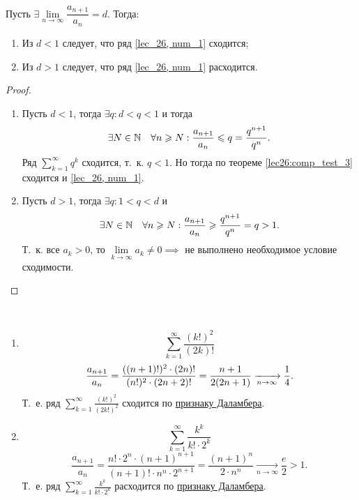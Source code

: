 \documentclass[../../main.tex]{subfiles}
\begin{document}
	\begin{thm}\label{lec27:dalamber}
		
		Пусть $\exists \lim\limits_{n \to \infty} \dfrac{a_{n+1}}{a_n} = d$. Тогда:
		\begin{enumerate}[label={\alph*)}]
		\item Из $d < 1$ следует, что ряд \eqref{lec_26, num_1} сходится;
		\item Из $d > 1$ следует, что ряд \eqref{lec_26, num_1} расходится.
		\end{enumerate}
	\end{thm}
		\begin{proof}
			
			~
			
			\begin{enumerate}[label={\alph*)}]
			\item Пусть $d < 1$, тогда $\exists q : d < q < 1$  и тогда \[\exists N \in 
			\mathbb{N} \quad
			\forall n \geqslant N:
			\frac{a_{n+1}}{a_n} \leqslant q = \frac{q^{n+1}}{q^n}.  \]
			Ряд $\sum\limits_{k=1}^{\infty} q^k$ сходится, т.~к. 
			$q<1$. Но тогда по теореме \ref{lec26:comp_test_3} сходится и 
			\eqref{lec_26, num_1}.
			\item Пусть $d > 1$, тогда $\exists q : 1 < q < d $ и \[\exists N \in \mathbb{N} 
			\quad \forall n 
			\geqslant N:
			\frac{a_{n+1}}{a_n} \geqslant \frac{q^{n+1}}{q^n} = q > 1.  \]
			Т.~к. все $a_k > 0$, то $\lim\limits_{k \to \infty} a_k \neq 0 \implies$ не 
			выполнено необходимое условие сходимости.
			\qedhere
			\end{enumerate}
		\end{proof}
	\begin{examples}

	~

	\begin{enumerate}
	 \item
		\[ \sum_{k = 1}^{\infty} \frac{(k!)^2}{(2k)!}    \]
		\[ \frac{a_{n+1}}{a_n} = \frac{((n+1)!)^2 \cdot (2n)!}{(n!)^2 \cdot (2n+2)!} 
		= 
		\frac{n+1}{2(2n+1)}  \xrightarrow[n \rightarrow \infty]{} \frac{1}{4}. \]
		Т.~е. ряд $\sum\limits_{k = 1}^{\infty} \frac{(k!)^2}{(2k!)^2}$ сходится по 
		\hyperref[lec27:dalamber]{признаку Даламбера}.
	\item
		\[  \sum_{k = 1}^{\infty} \frac{k^k}{k! \cdot 2^k} \]
		\[ \frac{a_{n+1}}{a_n} = \frac{n! \cdot 2^n \cdot (n+1)^{n+1}}{(n+1)! \cdot 
		n^n \cdot 
		2^{n+1}} = \frac{(n+1)^{n}}{2\cdot n^n } \underset{n \rightarrow \infty} 
		{\longrightarrow}  \frac{e}{2} > 1. \]
		Т.~е. ряд $\sum\limits_{k = 1}^{\infty} \frac{k^k}{k! \cdot 2^k}$ расходится 
		по 
		\hyperref[lec27:dalamber]{признаку Даламбера}.
	\end{enumerate}
	\end{examples}
\end{document}

